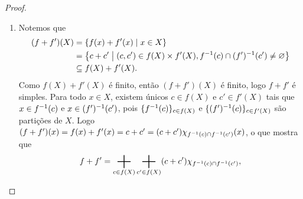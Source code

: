 \begin{proof}
\begin{enumerate}
	\item Notemos que
	\begin{align*}
	(f+f')(X) &= \left\{f(x)+f'(x) \;\middle\vert\; x \in X \right\} \\
		&= \left\{c+c' \;\middle\vert\; (c,c') \in f(X) \times f'(X), f^{-1}(c) \cap (f')^{-1}(c') \neq \varnothing \right\} \\
		&\subseteq f(X)+f'(X).
	\end{align*}
Como $f(X)+f'(X)$ é finito, então $(f+f')(X)$ é finito, logo $f+f'$ é simples. %
Para todo $x \in X$, existem únicos $c \in f(X)$ e $c' \in f'(X)$ tais que $x \in f^{-1}(c)$ e $x \in (f')^{-1}(c')$, pois $\{f^{-1}(c)\}_{c \in f(X)}$ e $\{(f')^{-1}(c)\}_{c \in f'(X)}$ são partições de $X$. Logo $(f+f')(x) = f(x)+f'(x) = c+c' = (c+c') \chi_{f^{-1}(c) \cap f^{-1}(c')}(x)$, o que mostra que
	\begin{equation*}
	f+f' = \sum_{c \in f(X)} \sum_{c' \in f(X)} (c + c') \idc_{f\inv(c) \cap f\inv(c')},

\end{equation*}
\end{enumerate}
\end{proof}
